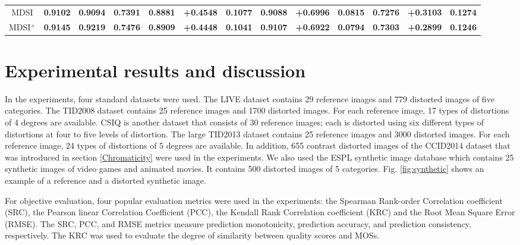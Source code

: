 \begin{table*}[htb]
\begin{tabular}{c|ccc|l|ccc|ccc|ccc}
MDSI                       & \textbf{0.9102}   & \textbf{0.9094}   & \multicolumn{2}{c|}{\textbf{0.7391}} & \textbf{0.8881} & \textbf{+0.4548} & \textbf{0.1077} & \textbf{0.9088} & \textbf{+0.6996} & \textbf{0.0815} & \textbf{0.7276} & \textbf{+0.3103} & \textbf{0.1274} \\
MDSI$^+$                       & \textbf{0.9145}   & \textbf{0.9219}   & \multicolumn{2}{c|}{\textbf{0.7476}} & \textbf{0.8909} & \textbf{+0.4448} & \textbf{0.1041} & \textbf{0.9107} & \textbf{+0.6922} & \textbf{0.0794} & \textbf{0.7303} & \textbf{+0.2899} & \textbf{0.1246} \\
\hline       
\end{tabular}
\label{results2}
\end{table*}

 
 
 





\section{Experimental results and discussion}
\label{results}

In the experiments, four standard datasets were used. The LIVE dataset \cite{LIVEweb} contains 29 reference images and 779 distorted images of five categories. The TID2008 \cite{TID2008} dataset contains 25 reference images and 1700 distorted images. For each reference image, 17 types of distortions of 4 degrees are available. CSIQ \cite{MAD} is another dataset that consists of 30 reference images; each is distorted using six different types of distortions at four to five levels of distortion. The large TID2013 \cite{TID2013} dataset contains 25 reference images and 3000 distorted images. For each reference image, 24 types of distortions of 5 degrees are available. In addition, 655 contrast distorted images of the CCID2014 dataset \cite{CCID2014} that was introduced in section \ref{Chromaticity} were used in the experiments. We also used the ESPL synthetic image database which contains 25 synthetic images of video games and animated movies. It contains 500 distorted images of 5 categories. Fig. \ref{fig:synthetic} shows an example of a reference and a distorted synthetic image. 






For objective evaluation, four popular evaluation metrics were used in the experiments: the Spearman Rank-order Correlation coefficient (SRC), the Pearson linear Correlation Coefficient (PCC), the Kendall Rank Correlation coefficient (KRC) and the Root Mean Square Error (RMSE). The SRC, PCC, and RMSE metrics measure prediction monotonicity, prediction accuracy, and prediction consistency, respectively. The KRC was used to evaluate the degree of similarity between quality scores and MOSs.


